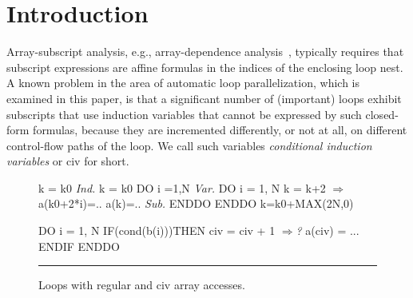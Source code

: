 \documentclass{sig-alternate}
\newcommand{\emp}[1]{\textcolor{DikuRed}{ #1}}
\newcommand{\emphh}[1]{\textcolor{CosGreen}{ #1}}
\newcommand{\mymath}[1]{$ #1 $}
\begin{document}





\section{Introduction}


\enlargethispage{\baselineskip}

Array-subscript analysis, e.g., array-dependence analysis~\cite{BanerjeeIneqTest,FeautrierDataflow,Pugh92theomega},
typically requires that subscript expressions are affine formulas
in the indices of the enclosing loop nest.   A known problem in 
the area of automatic loop parallelization, which is examined in this paper, 
is that a significant number of (important) loops exhibit subscripts 
that use induction variables that cannot be expressed by such closed-form 
formulas, because they are incremented differently, or not at all, on 
different control-flow paths of the loop.   We call such variables
{\em conditional induction variables} or {\sc civ} for short.


\begin{figure}
\begin{minipage}{0.58\columnwidth}
\begin{colorcode}
k = k0     \emphh{\em Ind.}  k = k0        
DO i =1,N  \emphh{\em Var.}  DO i = 1, N      
  k = k+2    \emphh{\mymath{\Rightarrow}}    a(k0+2*i)=.. 
  a(k)=..  \emphh{\em Sub.}  ENDDO         
ENDDO            k=k0+MAX(2N,0)
\end{colorcode}
\end{minipage}
\begin{minipage}{0.35\columnwidth}
\begin{colorcode}
DO i = 1, N
 IF(cond(b(i)))THEN 
    civ = civ + 1 \emp{\mymath{\Rightarrow}{\em ?}} 
    a(civ) = ...
ENDIF ENDDO
\end{colorcode}
\end{minipage}
\hrule
\caption{Loops with regular and {\sc civ} array accesses.}
\label{fig:introEg}
\vspace{-2ex}
\end{figure}
\end{document}
